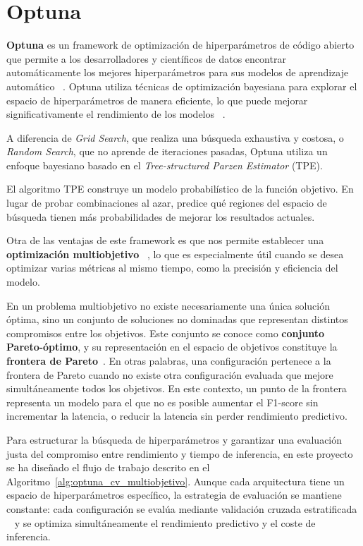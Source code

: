 \section{Optuna}
\textbf{Optuna} es un framework de optimización de hiperparámetros de código abierto que permite a los desarrolladores y científicos de datos encontrar automáticamente los mejores hiperparámetros para sus modelos de aprendizaje automático ~\cite{akiba2019optuna}. Optuna utiliza técnicas de optimización bayesiana para explorar el espacio de hiperparámetros de manera eficiente, lo que puede mejorar significativamente el rendimiento de los modelos ~\cite{optuna}.

A diferencia de \textit{Grid Search}, que realiza una búsqueda exhaustiva y costosa, o \textit{Random Search}, que no aprende de iteraciones pasadas, Optuna utiliza un enfoque bayesiano basado en el \textit{Tree-structured Parzen Estimator} (TPE).

El algoritmo TPE construye un modelo probabilístico de la función objetivo. En lugar de probar combinaciones al azar, predice qué regiones del espacio de búsqueda tienen más probabilidades de mejorar los resultados actuales.

Otra de las ventajas de este framework es que nos permite establecer una \textbf{optimización multiobjetivo} ~\cite{opt_multiobjective}, lo que es especialmente útil cuando se desea optimizar varias métricas al mismo tiempo, como la precisión y eficiencia del modelo. 

En un problema multiobjetivo no existe necesariamente una única solución óptima, sino un conjunto de soluciones no dominadas que representan distintos compromisos entre los objetivos. Este conjunto se conoce como \textbf{conjunto Pareto-óptimo}, y su representación en el espacio de objetivos constituye la \textbf{frontera de Pareto}~\cite{deb2001multiobjective}. En otras palabras, una configuración pertenece a la frontera de Pareto cuando no existe otra configuración evaluada que mejore simultáneamente todos los objetivos. En este contexto, un punto de la frontera representa un modelo para el que no es posible aumentar el F1-score sin incrementar la latencia, o reducir la latencia sin perder rendimiento predictivo.

Para estructurar la búsqueda de hiperparámetros y garantizar una evaluación justa del compromiso entre rendimiento y tiempo de inferencia, en este proyecto se ha diseñado el flujo de trabajo descrito en el Algoritmo~\ref{alg:optuna_cv_multiobjetivo}.
Aunque cada arquitectura tiene un espacio de hiperparámetros específico, la estrategia de evaluación se mantiene constante: cada configuración se evalúa mediante validación cruzada estratificada ~\cite{sklearn_stratifiedkfold} y se optimiza simultáneamente el rendimiento predictivo y el coste de inferencia.

